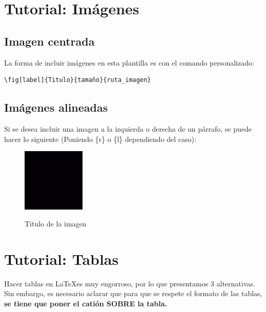 \section{Tutorial: Imágenes}
\subsection{Imagen centrada}
La forma de incluir imágenes en esta plantilla es con el comando personalizado:
\begin{verbatim} 
\fig[label]{Titulo}{tamaño}{ruta_imagen}
\end{verbatim}



\subsection{Imágenes alineadas}
Si se desea incluir una imagen a la izquierda o derecha de un párrafo, se puede hacer lo siguiente (Poniendo \{r\} o \{l\} dependiendo del caso):

\begin{figure} %
    \centering
    \begin{measuredfigure}
        \caption{Titulo de la imagen}
        \includegraphics[height=3cm]{img/cuadradoejemplo.png} %
        \label{img:referencia2}
    \end{measuredfigure}
\end{figure}


\textcolor{silver}{
    \lipsum[2]
}

\newpage
\section{Tutorial: Tablas}

Hacer tablas en \LaTeX es muy engorroso, por lo que presentamos 3 alternativas. Sin embargo, es necesario aclarar que para que se respete el formato de las tablas, \textbf{se tiene que poner el catión SOBRE la tabla.}

